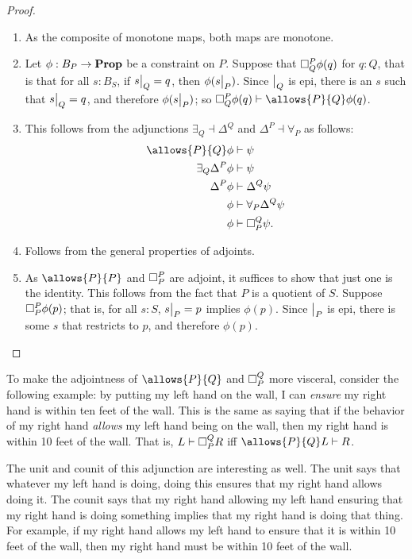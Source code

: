     \begin{proof}
    ~
    \begin{enumerate}
        \item As the composite of monotone maps, both maps are monotone.
        \item Let $\phi : B_P \to \Prop$ be a constraint on $P$. Suppose that $\ensure{P}{Q}\phi(q)$ for $q : Q$, that is that for all $s : B_S$, if $\rest{s}{Q} = q$, then $\phi(\rest{s}{P})$. Since $\rest{}{Q}$ is epi, there is an $s$ such that $\rest{s}{Q} = q$, and therefore $\phi(\rest{s}{P})$; so $\ensure{P}{Q}\phi(q) \vdash \allows{P}{Q}\phi(q)$.
        \item This follows from the adjunctions $\exists_Q \dashv \Delta^Q$ and $\Delta^P \dashv \forall_P$ as follows:
        \begin{align*}
            \allows{P}{Q} \phi &\vdash \psi \\ 
            \exists_Q \Delta^P \phi &\vdash \psi \\
            \Delta^P \phi &\vdash \Delta^Q \psi \\ 
            \phi &\vdash \forall_P \Delta^Q \psi \\
            \phi &\vdash \ensure{Q}{P} \psi.
        \end{align*}
        \item Follows from the general properties of adjoints.
        \item As $\allows{P}{P}$ and $\ensure{P}{P}$ are adjoint, it suffices to show that just one is the identity. This follows from the fact that $P$ is a quotient of $S$. Suppose $\ensure{P}{P}\phi(p)$; that is, for all $s : S$, $\rest{s}{P} = p$ implies $\phi(p)$. Since $\rest{}{P}$ is epi, there is some $s$ that restricts to $p$, and therefore $\phi(p)$. \qedhere
        
    \end{enumerate}
    \end{proof}
    
 To make the adjointness of $\allows{P}{Q}$ and $\ensure{Q}{P}$ more visceral, consider the following example: by putting my left hand on the wall, I can \emph{ensure} my right hand is within ten feet of the wall. This is the same as saying that if the behavior of my right hand \emph{allows} my left hand being on the wall, then my right hand is within 10 feet of the wall. That is, $L\vdash\ensure{Q}{P}R$ iff $\allows{P}{Q}L\vdash R$.
    
    The unit and counit of this adjunction are interesting as well. The unit
    says that whatever my left hand is doing, doing this ensures that my right
    hand allows doing it. The counit says that my right hand allowing my left hand ensuring that my right hand is doing something implies
    that my right hand is doing that thing. For example, if my right hand allows
    my left hand to ensure that it is within 10 feet of the wall, then my right hand must be within 10 feet of the wall.
    
